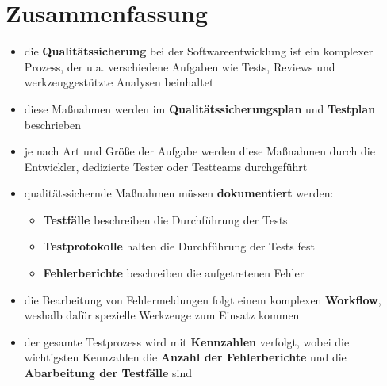 \section{Zusammenfassung}

\begin{itemize}
    \item die \textbf{Qualitätssicherung} bei der Softwareentwicklung ist ein komplexer Prozess, der u.a. verschiedene Aufgaben wie Tests, Reviews und werkzeuggestützte Analysen beinhaltet
    \item diese Maßnahmen werden im \textbf{Qualitätssicherungsplan} und \textbf{Testplan} beschrieben
    \item je nach Art und Größe  der Aufgabe werden diese Maßnahmen durch die Entwickler, dedizierte Tester oder Testteams durchgeführt
    \item qualitätssichernde Maßnahmen müssen \textbf{dokumentiert} werden:
    \begin{itemize}
        \item \textbf{Testfälle} beschreiben die Durchführung der Tests
        \item \textbf{Testprotokolle} halten die Durchführung der Tests fest
        \item \textbf{Fehlerberichte} beschreiben die aufgetretenen Fehler
    \end{itemize}
    \item die Bearbeitung von Fehlermeldungen folgt einem komplexen \textbf{Workflow}, weshalb dafür spezielle Werkzeuge zum Einsatz kommen
    \item der gesamte Testprozess wird mit \textbf{Kennzahlen} verfolgt, wobei die wichtigsten Kennzahlen die \textbf{Anzahl der Fehlerberichte} und die \textbf{Abarbeitung der Testfälle} sind
\end{itemize}